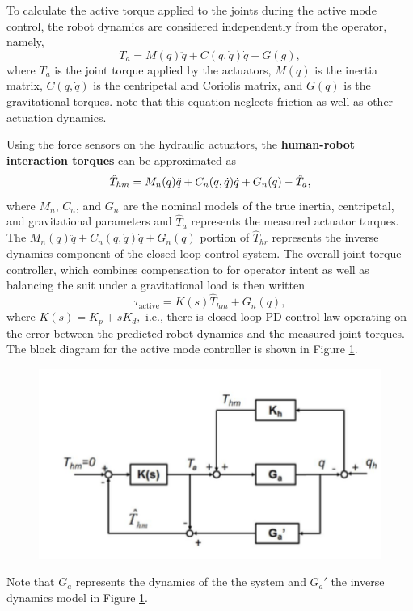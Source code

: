 To calculate the active torque applied to the joints during the active mode control, the robot dynamics are considered independently from the operator, namely,
\begin{equation}
T_a = M(q)\ddot{q} + C(q,\dot{q})\dot{q}+G(g),
\label{dynamics}
\end{equation}   
where $T_a$ is the joint torque applied by the actuators, $M(q)$ is the inertia matrix, $C(q,\dot{q})$ is the centripetal and Coriolis matrix, and $G(q)$ is the gravitational torques. note that this equation neglects friction as well as other actuation dynamics.

Using the force sensors on the hydraulic actuators, the {\bf human-robot interaction torques} can be approximated as
\begin{equation}
\hat{T}_{hm} = M_n(q)\ddot{q} + C_n(q,\dot{q})\dot{q} + G_n(q) - \hat{T}_a, \notag
\end{equation}
where $M_n$, $C_n$, and $G_n$ are the nominal models of the true inertia, centripetal, and gravitational parameters and $\hat{T}_a$ represents the measured actuator torques.  The $M_n(q)\ddot{q} + C_n(q,\dot{q})\dot{q} + G_n(q) $ portion of $\hat{T}_{hr}$ represents the inverse dynamics component of the closed-loop control system.  The overall joint torque controller, which combines compensation to for operator intent as well as balancing the suit under a gravitational load is then written \[ \tau_\text{active} = K(s) \hat{T}_{hm} + G_n(q),\] where $K(s) = K_p +s K_d,$ i.e., there is closed-loop PD control law operating on the error between the predicted robot dynamics and the measured joint torques.  The block diagram for the active mode controller is shown in Figure \ref{fig:blockDia}. 
 \begin{figure}[thpb]
\centering
\includegraphics[width=3.in]{exos/figs/hydLowerExrem/blockDia}
  \caption{}
  \vspace{-0.2in}
 \label{fig:blockDia}   
 \end{figure}
 Note that $G_a$ represents the dynamics of the the system and $G_a'$ the inverse dynamics model in Figure \ref{fig:blockDia}.

